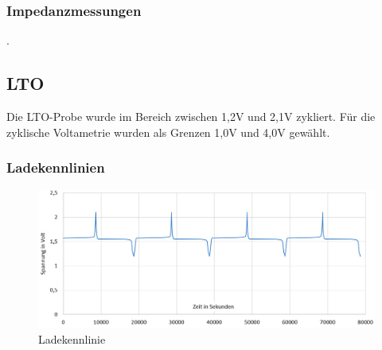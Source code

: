 \documentclass[a4paper, 11pt, headsepline,footsepline,twoside,abstract]{scrbook}
\begin{document}
\subsubsection{Impedanzmessungen}
.
\newpage
\subsection{LTO}
Die LTO-Probe wurde im Bereich zwischen 1,2V und 2,1V zykliert. Für die zyklische Voltametrie wurden als Grenzen 1,0V und 4,0V gewählt.
\subsubsection{Ladekennlinien}
\begin{figure}
	\centering
	\includegraphics[width=1.0\columnwidth]{images/GCPL_LTO.jpg}
	\caption{Ladekennlinie}
	\label{gcpl_LTO}
\end{figure}
\end{document}
